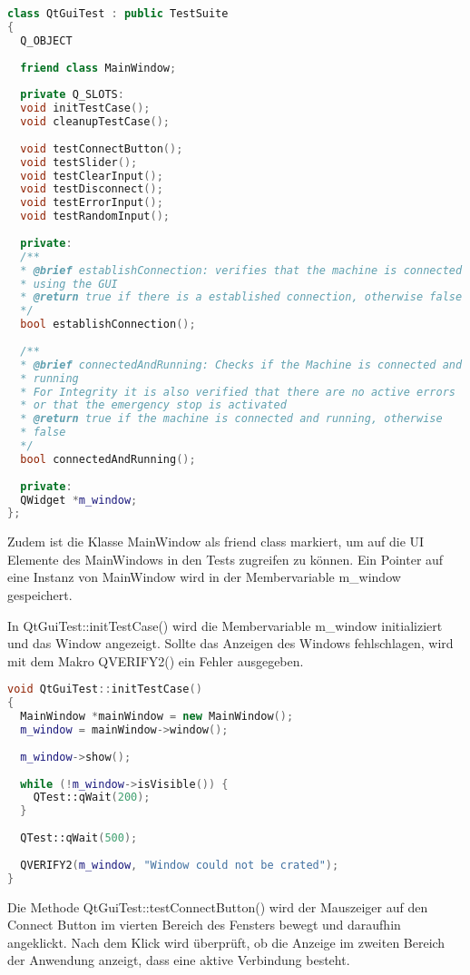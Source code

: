 		\begin{lstlisting}[language=C++, caption=qtguitest.cpp]		
class QtGuiTest : public TestSuite
{
  Q_OBJECT
	
  friend class MainWindow;
	
  private Q_SLOTS:
  void initTestCase();
  void cleanupTestCase();
	
  void testConnectButton();
  void testSlider();
  void testClearInput();
  void testDisconnect();
  void testErrorInput();
  void testRandomInput();
	
  private:
  /**
  * @brief establishConnection: verifies that the machine is connected
  * using the GUI
  * @return true if there is a established connection, otherwise false
  */
  bool establishConnection();
	
  /**
  * @brief connectedAndRunning: Checks if the Machine is connected and
  * running
  * For Integrity it is also verified that there are no active errors
  * or that the emergency stop is activated
  * @return true if the machine is connected and running, otherwise
  * false
  */
  bool connectedAndRunning();
	
  private:
  QWidget *m_window;
};
		\end{lstlisting}
	
		Zudem ist die Klasse MainWindow als friend class markiert, um auf die UI Elemente des MainWindows in den Tests zugreifen zu können. Ein Pointer auf eine Instanz von MainWindow wird in der Membervariable m\_window gespeichert.
		
		In QtGuiTest::initTestCase() wird die Membervariable m\_window initializiert und das Window angezeigt. Sollte das Anzeigen des Windows fehlschlagen, wird mit dem Makro QVERIFY2() ein Fehler ausgegeben.
		
		\begin{lstlisting}[language=C++, caption=qtguitest.cpp]	
void QtGuiTest::initTestCase()
{
  MainWindow *mainWindow = new MainWindow();
  m_window = mainWindow->window();
	
  m_window->show();
	
  while (!m_window->isVisible()) {
    QTest::qWait(200);
  }
	
  QTest::qWait(500);
	
  QVERIFY2(m_window, "Window could not be crated");
}		
		\end{lstlisting}
		Die Methode QtGuiTest::testConnectButton() wird der Mauszeiger auf den Connect Button im vierten Bereich des Fensters bewegt und daraufhin angeklickt. Nach dem Klick wird überprüft, ob die Anzeige im zweiten Bereich der Anwendung anzeigt, dass eine aktive Verbindung besteht.
	
